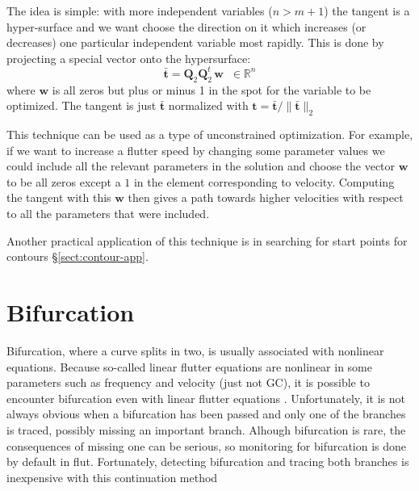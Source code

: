 \documentclass[10pt,openany,twoside]{book}
\numberwithin{equation}{section}   %
\newcommand{\Cmd}[1]{{\sf #1}}
\newcommand{\Matrix}[1]{\boldsymbol{#1}}
\newcommand{\Vector}[1]{\boldsymbol{#1}}
\newcommand{\Gc}{GC}
\newcommand{\Sectref}[1]{\S\ref{#1}}
\begin{document}
The idea is simple: with more independent variables ($n > m+1$)
the tangent is a hyper-surface and we want choose the direction on it
which increases (or decreases) one particular independent variable most
rapidly. This is done by projecting a special vector onto the hypersurface:
\begin{equation} \label{eqn:project}
\bar{\Vector{t}} = \Matrix{Q}_2\Matrix{Q}_2^t\,\Vector{w} \;\; \in \mathbb{R}^n
\end{equation}
where $\Vector{w}$ is all zeros but plus or minus 1 in the spot for
the variable to be optimized.
The tangent is just $\bar{\Vector{t}}$ normalized with
$\Vector{t} = \bar{\Vector{t}}/\|\bar{\Vector{t}}\|_2$

This technique can be used as a type of unconstrained optimization.
For example, if we want to increase a flutter speed by changing some parameter values
we could include all the relevant parameters in the solution and choose
the vector $\Vector{w}$ to be all zeros except a $1$ in the element
corresponding to velocity. Computing the tangent with this $\Vector{w}$
then gives a path towards higher velocities with respect to all the
parameters that were included.

Another practical application of this technique is in searching for
start points for contours \Sectref{sect:contour-app}.

\section{Bifurcation}\label{sect:bifurcation}
Bifurcation, where a curve splits in two, is usually associated
with nonlinear equations. Because so-called linear flutter equations
are nonlinear in some parameters such as frequency and velocity
(just not \Gc),
it is possible to encounter bifurcation even with linear flutter
equations \cite{meyer2015continuation}.
Unfortunately, it is not always obvious when a bifurcation
has been passed and only one of the branches is traced, possibly
missing an important branch.
Alhough bifurcation is rare, the consequences of missing one can be
serious, so monitoring for bifurcation is done by default in \Cmd{flut}.
Fortunately, detecting bifurcation and tracing both branches is
inexpensive with this continuation method
\end{document}
